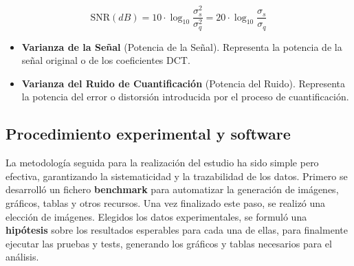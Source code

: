 \documentclass[a4paper, 12pt]{article}
\begin{document}
\begin{equation}
\text{SNR}(dB) = 10 \cdot \log_{10} \frac{\sigma_{s}^{2}}{\sigma_{q}^{2}} = 20 \cdot \log_{10} \frac{\sigma_{s}}{\sigma_{q}}
\end{equation}

\begin{itemize}
    \item[$\sigma_{s}^{2}$] \textbf{Varianza de la Señal} (Potencia de la Señal). Representa la potencia de la señal original o de los coeficientes DCT.
    \item[$\sigma_{q}^{2}$] \textbf{Varianza del Ruido de Cuantificación} (Potencia del Ruido). Representa la potencia del error o distorsión introducida por el proceso de cuantificación.
\end{itemize}
\vspace{0.5cm}




\subsection{Procedimiento experimental y software}
La metodología seguida para la realización del estudio ha sido simple pero efectiva, garantizando la sistematicidad y la trazabilidad de los datos. Primero se desarrolló un fichero \textbf{benchmark} para automatizar la generación de imágenes, gráficos, tablas y otros recursos. Una vez finalizado este paso, se realizó una elección de imágenes. Elegidos los datos experimentales, se formuló una \textbf{hipótesis} sobre los resultados esperables para cada una de ellas, para finalmente ejecutar las pruebas y tests, generando los gráficos y tablas necesarios para el análisis.
\end{document}
